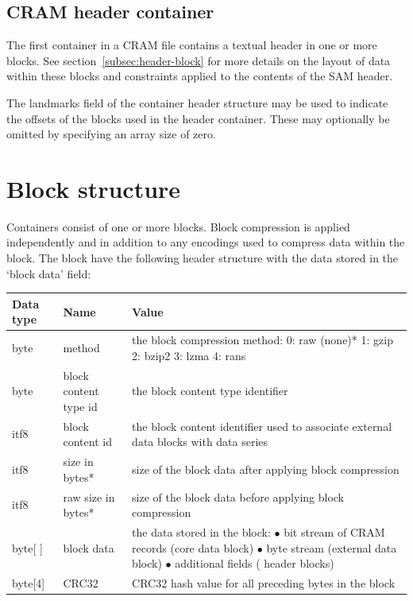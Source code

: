 \documentclass[a4paper]{article}
\begin{document}
\subsection{\textbf{CRAM header container}}
\label{subsec:cram-header-container}

The first container in a CRAM file contains a textual header in one or more blocks.  See section~\ref{subsec:header-block} for more details on the layout of data within these blocks and constraints applied to the contents of the SAM header.

The landmarks field of the container header structure may be used to
indicate the offsets of the blocks used in the header container.
These may optionally be omitted by specifying an array size of zero.

\section{\textbf{Block structure}}
\label{sec:block}

Containers consist of one or more blocks. Block compression is applied independently 
and in addition to any encodings used to compress data within the block. The block 
have the following header structure with the data stored in the `block data' field:

\begin{tabular}{|l|>{\raggedright}p{120pt}|>{\raggedright}p{260pt}|}
\hline
\textbf{Data type} & \textbf{Name} & \textbf{Value}
\tabularnewline
\hline
byte & method & the block compression method: \linebreak{}
0: raw (none)*\linebreak{}
1: gzip\linebreak{}
2: bzip2\linebreak{}
3: lzma\linebreak{}
4: rans\tabularnewline
\hline
byte & block content type id & the block content type identifier\tabularnewline
\hline
itf8 & block content id & the block content identifier used to associate external 
data blocks with data series\tabularnewline
\hline
itf8 & size in bytes* & size of the block data after applying block compression\tabularnewline
\hline
itf8 & raw size in bytes* & size of the block data before applying block compression\tabularnewline
\hline
byte[ ] & block data & the data stored in the block:\linebreak{}
$\bullet$ bit stream of CRAM records (core data block)\linebreak{}
$\bullet$ byte stream (external data block)\linebreak{}
$\bullet$ additional fields ( header blocks)\tabularnewline
\hline
byte[4] & CRC32 & CRC32 hash value for all preceding bytes in the block\tabularnewline
\hline
\end{tabular}
\end{document}
